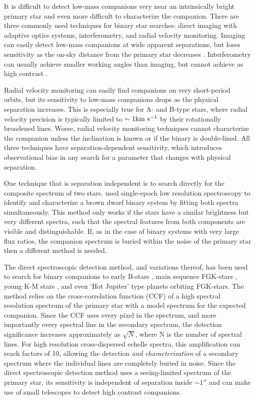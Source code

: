 \documentclass{emulateapj}
\begin{document}
It is difficult to detect low-mass companions very near an intrinsically bright primary star and even more difficult to characterize the companion. There are three commonly used techniques for binary star searches: direct imaging with adaptive optics systems,  interferometry, and radial velocity monitoring. Imaging can easily detect low-mass companions at wide apparent separations, but loses sensitivity as the on-sky distance from the primary star decreases \citep[see][for typical sensitivity curves]{DeRosa2014}. Interferometry can usually achieve smaller working angles than imaging, but cannot achieve as high contrast \citep[see e.g.][]{Aldoretta2015}.

 Radial velocity monitoring can easily find companions on very short-period orbits, but its sensitivity to low-mass companions drops as the physical separation increases. This is especially true for A- and B-type stars, where radial velocity precision is typically limited to $\sim 1 \rm km \  s^{-1}$ by their rotationally broadened lines. Worse, radial velocity monitoring techniques cannot characterize the companion unless the inclination is known or if the binary is double-lined. All three techniques have separation-dependent sensitivity, which introduces observational bias in any search for a parameter that changes with physical separation.
 
 One technique that is separation independent is to search directly for the composite spectrum of two stars. \citet{Burgasser2007} used single-epoch low resolution spectroscopy to identify and characterize a brown dwarf binary system by fitting both spectra simultaneously. This method only works if the stars have a similar brightness but very different spectra, such that the spectral features from both components are visible and distinguishable. If, as in the case of binary systems with very large flux ratios, the companion spectrum is buried within the noise of the primary star then a different method is needed.
 
The direct spectroscopic detection method, and variations thereof, has been used to search for binary companions to early B-stars \citep{Gullikson2013}, main sequence FGK-stars \citep{Kolbl2015}, young K-M stars \citep{Prato2002}, and even `Hot Jupiter' type planets \citep{Snellen2010, Brogi2012, deKok2013} orbiting FGK-stars. The method relies on the cross-correlation function (CCF) of a high spectral resolution spectrum of the primary star with a model spectrum for the expected companion. Since the CCF uses every pixel in the spectrum, and more importantly every spectral line in the secondary spectrum, the detection significance increases approximately as $\sqrt{N}$, where N is the number of spectral lines. For high resolution cross-dispersed echelle spectra, this amplification can reach factors of 10, allowing the detection \emph{and characterization} of a secondary spectrum where the individual lines are completely buried in noise. Since the direct spectroscopic detection method uses a seeing-limited spectrum of the primary star, its sensitivity is independent of separation inside $\sim 1 ''$ and can make use of small telescopes to detect high contrast companions.
\end{document}
